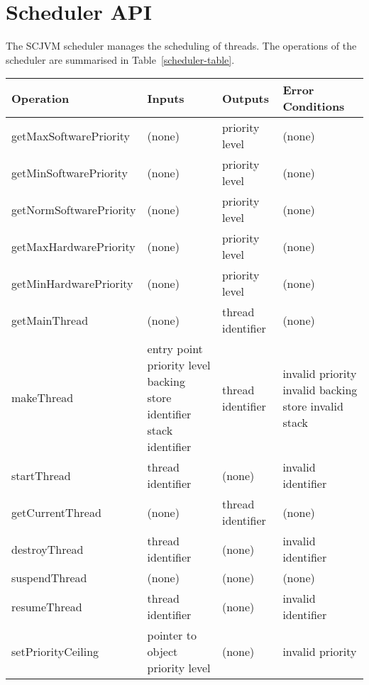 \documentclass[a4paper,10pt]{report}
\begin{document}
\section{Scheduler API}
\label{scheduler-section}

The SCJVM scheduler manages the scheduling of threads.
The operations of the scheduler are summarised in
Table~\ref{scheduler-table}.

\begin{table}[ht]
  \centering
  \footnotesize
  \begin{tabular}{|l|p{3cm}|p{2.2cm}|p{2.7cm}|}
    Operation & Inputs & Outputs & Error Conditions \\
    \hline
    getMaxSoftwarePriority &
    (none) &
    priority level &
    (none)
    \\getMinSoftwarePriority &
    (none) &
    priority level &
    (none)
    \\getNormSoftwarePriority &
    (none) &
    priority level &
    (none)
    \\getMaxHardwarePriority &
    (none) &
    priority level &
    (none)
    \\getMinHardwarePriority &
    (none) &
    priority level &
    (none)
    \\getMainThread &
    (none) &
    thread identifier &
    (none)
    \\makeThread &
    entry point \newline
    priority level \newline
    backing store identifier \newline
    stack identifier &
    thread identifier &
    invalid priority \newline
    invalid backing store \newline
    invalid stack
    \\startThread &
    thread identifier &
    (none) &
    invalid identifier
    \\getCurrentThread &
    (none) &
    thread identifier &
    (none)
    \\destroyThread &
    thread identifier &
    (none) &
    invalid identifier
    \\suspendThread &
    (none) &
    (none) &
    (none)
    \\resumeThread &
    thread identifier &
    (none) &
    invalid identifier
    \\setPriorityCeiling &
    pointer to object \newline
    priority level &
    (none) &
    invalid priority

\end{tabular}
\end{table}
\end{document}
